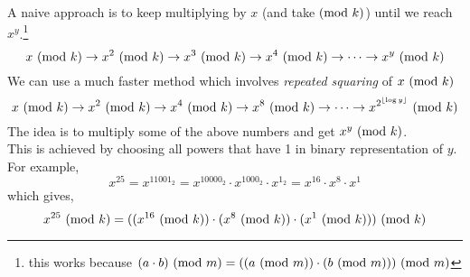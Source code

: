 A naive approach is to keep multiplying by $x$ (and take$\ (\mathrm{mod}\ k)$) until we reach $x^y$.\footnote{this works because $(a\cdot b)\ (\mathrm{mod}\ m) =  ((a\ (\mathrm{mod}\ m))\cdot(b\ (\mathrm{mod}\ m)))\ (\mathrm{mod}\ m)$}
\begin{equation*}
x \ (\mathrm{mod}\ k) \rightarrow x^2 \ (\mathrm{mod}\ k) \rightarrow x^3 \ (\mathrm{mod}\ k) \rightarrow x^4 \ (\mathrm{mod}\ k) \rightarrow \cdots \rightarrow x^y \ (\mathrm{mod}\ k)
\end{equation*}
We can use a much faster method which involves \emph{repeated squaring} of $x \ (\mathrm{mod}\ k)$
\begin{equation}
x \ (\mathrm{mod}\ k) \rightarrow x^2 \ (\mathrm{mod}\ k) \rightarrow x^4 \ (\mathrm{mod}\ k) \rightarrow x^8 \ (\mathrm{mod}\ k) \rightarrow \cdots \rightarrow x^{2^{\lfloor\log y\rfloor}} \ (\mathrm{mod}\ k)
\end{equation}
The idea is to multiply some of the above numbers and get $x^y \ (\mathrm{mod}\ k)$.\\
This is achieved by choosing all powers that have 1 in binary representation of $y$.\\
For example,
\begin{equation*}
x^{25} = x ^ {11001_2} = x ^ {10000_2} \cdot x ^ {1000_2} \cdot x ^ {1_2} = x ^ {16} \cdot x ^ 8 \cdot x ^ 1
\end{equation*}
which gives,
\begin{equation*}
x^{25} \ (\mathrm{mod}\ k)  = ((x ^ {16} \ (\mathrm{mod}\ k))\cdot (x ^ 8\ (\mathrm{mod}\ k))  \cdot (x ^ 1\ (\mathrm{mod}\ k))) \ (\mathrm{mod}\ k)
\end{equation*}
